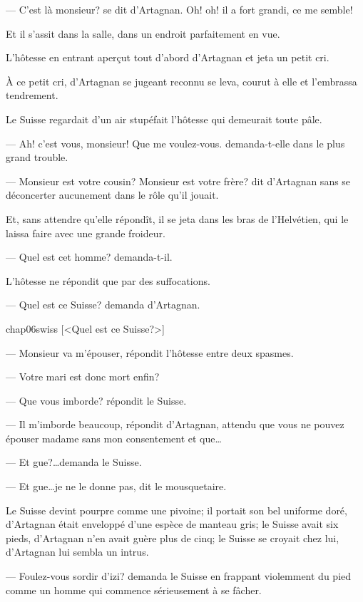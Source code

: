 — C'est là monsieur? se dit d'Artagnan. Oh! oh! il a fort grandi, ce me semble!

Et il s'assit dans la salle, dans un endroit parfaitement en vue.

L'hôtesse en entrant aperçut tout d'abord d'Artagnan et jeta un petit cri.

À ce petit cri, d'Artagnan se jugeant reconnu se leva, courut à elle et l'embrassa tendrement.

Le Suisse regardait d'un air stupéfait l'hôtesse qui demeurait toute pâle.

— Ah! c'est vous, monsieur! Que me voulez-vous. demanda-t-elle dans le plus grand trouble.

— Monsieur est votre cousin? Monsieur est votre frère? dit d'Artagnan sans se déconcerter aucunement dans le rôle qu'il jouait.

Et, sans attendre qu'elle répondît, il se jeta dans les bras de l'Helvétien, qui le laissa faire avec une grande froideur.

— Quel est cet homme? demanda-t-il.

L'hôtesse ne répondit que par des suffocations.

— Quel est ce Suisse? demanda d'Artagnan.

\begin{colorbigpic}
	[\basicscale] 
	{chap06swiss}
	[<Quel est ce Suisse?>]
\end{colorbigpic}

— Monsieur va m'épouser, répondit l'hôtesse entre deux spasmes.

— Votre mari est donc mort enfin?

— Que vous imborde? répondit le Suisse.

— Il m'imborde beaucoup, répondit d'Artagnan, attendu que vous ne pouvez épouser madame sans mon consentement et que\dots

— Et gue?\dots demanda le Suisse.

— Et gue\dots je ne le donne pas, dit le mousquetaire.

Le Suisse devint pourpre comme une pivoine; il portait son bel uniforme doré, d'Artagnan était enveloppé d'une espèce de manteau gris; le Suisse avait six pieds, d'Artagnan n'en avait guère plus de cinq; le Suisse se croyait chez lui, d'Artagnan lui sembla un intrus.

— Foulez-vous sordir d'izi? demanda le Suisse en frappant violemment du pied comme un homme qui commence sérieusement à se fâcher.

